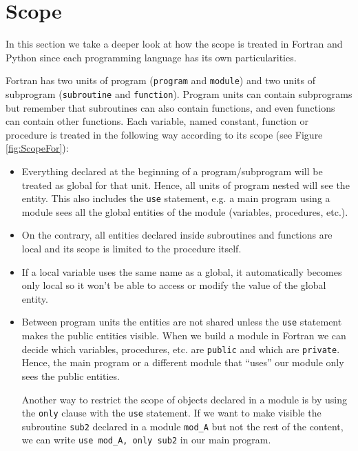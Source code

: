 \chapter{Scope} 


In this section we take a deeper look at how the scope is treated in Fortran and Python since each programming language has its own particularities. 

Fortran has two units of program (\texttt{program} and \texttt{module}) and two units of subprogram (\texttt{subroutine} and \texttt{function}).
Program units can contain subprograms but remember that subroutines can also contain functions, and even functions can contain other functions. 
Each variable, named constant, function or procedure is treated in the following way according to its scope (see Figure \ref{fig:ScopeFor}):
\begin{itemize}
    \item Everything declared at the beginning of a program/subprogram will be treated as global for that unit. Hence, all units of program nested will see the entity.
    This also includes the \texttt{use} statement, e.g. a main program using a module sees all the global entities of the module (variables, procedures, etc.). 
    
    \item On the contrary, all entities declared inside subroutines and functions are local and its scope is limited to the procedure itself. 
    
    \item If a local variable uses the same name as a global, it automatically becomes only local so it won't be able to access or modify the value of the global entity. 
    
    \item Between program units the entities are not shared unless the \texttt{use} statement makes the public entities visible. 
    When we build a module in Fortran we can decide which variables, procedures, etc. are \texttt{public} and which are \texttt{private}. 
    Hence, the main program or a different module that ``uses'' our module only sees the public entities.
    
    Another way to restrict the scope of objects declared in a module is by using the \texttt{only} clause with the \texttt{use} statement. 
    If we want to make visible the subroutine \texttt{sub2} declared in a module \texttt{mod\_A} but not the rest of the content, we can write \texttt{use mod\_A, only sub2} in our main program. 
\end{itemize}

